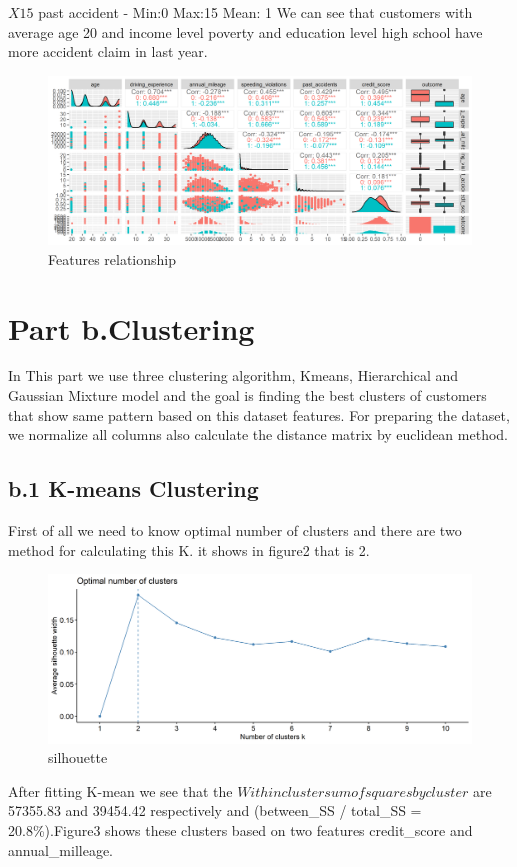 \documentclass[a4paper, 11pt]{article}
\begin{document}
$X15$ past accident -     Min:0       Max:15       Mean: 1\newline
We can see that customers with average age 20 and income level poverty and education level high school have more accident claim in last year. 
\begin{figure}[H]
	\centering
	\includegraphics[width=\textwidth]{figure1.png}
	\caption{Features relationship}
\end{figure}

\section*{Part b.Clustering}
In This part we use three clustering algorithm, Kmeans, Hierarchical and Gaussian Mixture model and the goal is finding the best clusters of customers that show same pattern based on this dataset features. For preparing the dataset, we normalize all columns also calculate the distance matrix by euclidean method. 
\subsection*{b.1 K-means Clustering}
First of all we need to  know optimal number of clusters and there are two method for calculating this K. it shows in figure2 that is 2.
\begin{figure}[H]
	\centering
	\begin{minipage}[b]{.7\textwidth}
		\includegraphics[width=\textwidth]{figure17.png}
		\caption{silhouette}
	\end{minipage}
\end{figure}
After fitting K-mean we see that the $Within cluster sum of squares by cluster$ are 57355.83 and 39454.42 respectively and (between\_SS / total\_SS =  20.8\%).Figure3 shows these clusters based on two features credit\_score and annual\_milleage.
\end{document}
